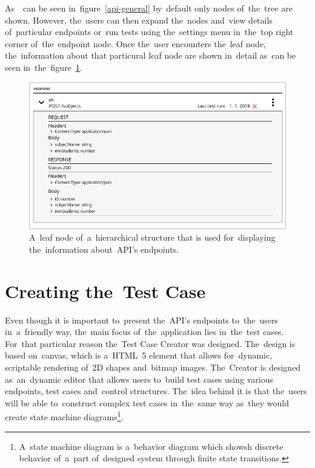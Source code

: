 As~~can be seen in~figure~\ref{api-general} by~default only  nodes
of~the~tree are shown. However, the~users can then expand the~nodes and~view
details of~particular endpoints or~run tests using the~settings menu in~the~top
right corner of~the~endpoint node. Once the~user encounters the~leaf node,
the~information about that particural leaf node are shown in~detail as~can be
seen in~the~figure~\ref{api-detail}.

\begin{figure}[!hbt]
	\centering
	\includegraphics[scale=0.4]{./designs/drafts-1.0/api-detail.png}
	\caption{A~leaf node of~a~hierarchical structure that is used for~displaying
	the~information about~API's endpoints.}
	\label{api-detail}
\end{figure}

\section{Creating the~Test Case}
Even though it is important to~present the~API's endpoints to~the~users
in~a~friendly way, the~main focus of~the~application lies in~the~test cases.
For~that particular reason the~Test Case Creator was designed. The~design is
based on~canvas, which is a~HTML~5 element that allows for~dynamic, scriptable
rendering of~2D shapes and~bitmap images. The~Creator is designed as~an~dynamic
editor that allows users to~build test cases using various endpoints, test cases
and~control structures. The~idea behind it is that the~users will be able
to~construct complex test cases in~the~same way as~they would create state
machine diagrams\footnote{A~state machine diagram is a~behavior diagram which
showsh discrete behavior of~a~part of~designed system through finite state
transitions.}.

